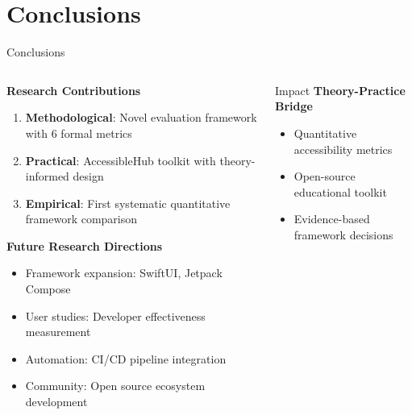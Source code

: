 \documentclass[10pt,aspectratio=169]{beamer}
\begin{document}
\section{Conclusions}

\begin{frame}{Conclusions}
    \begin{columns}[c]
        \begin{column}{0.6\textwidth}
            \textbf{Research Contributions}
            \begin{enumerate}
                \item \textbf{Methodological}: Novel evaluation framework with 6 formal metrics
                \item \textbf{Practical}: AccessibleHub toolkit with theory-informed design
                \item \textbf{Empirical}: First systematic quantitative framework comparison
            \end{enumerate}
            
            \vspace{0.5cm}
            
            \textbf{Future Research Directions}
            \begin{itemize}
                \item Framework expansion: SwiftUI, Jetpack Compose
                \item User studies: Developer effectiveness measurement
                \item Automation: CI/CD pipeline integration
                \item Community: Open source ecosystem development
            \end{itemize}
        \end{column}
        \begin{column}{0.35\textwidth}
            \begin{alertblock}{Impact}
                \textbf{Theory-Practice Bridge}
                \begin{itemize}
                    \item Quantitative accessibility metrics
                    \item Open-source educational toolkit
                    \item Evidence-based framework decisions
                \end{itemize}
            \end{alertblock}
        \end{column}
    \end{columns}
\end{frame}
\end{document}
